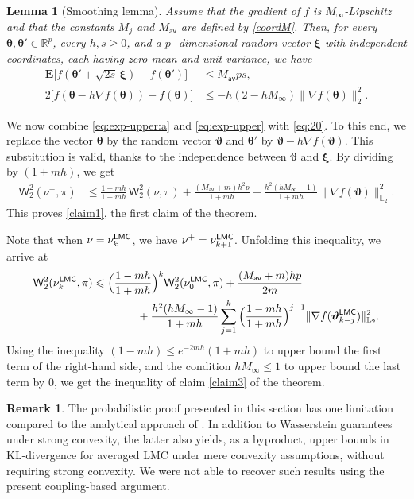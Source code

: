 \documentclass[aos,reqno]{imsart}
\newcommand\bxi{\boldsymbol\xi}
\newcommand\btheta{\boldsymbol\theta}
\newcommand\bvartheta{\boldsymbol\vartheta}
\def\wass{\mathsf{W}}
\def\Mav{M_{\textsf{av}}}
\def\Mmax{M_{\infty}}
\newtheorem{lemma}{Lemma}
\theoremstyle{definition}
\newtheorem{remark}{Remark}
\begin{document}
\begin{lemma}[Smoothing lemma]\label{lem:exp-upper}
    Assume that the gradient of $f$ is 
    $\Mmax$-Lipschitz and that the constants $M_j$
    and\/ $\Mav$ are defined by \eqref{coordM}. Then,
    for every  $\btheta,\btheta'\in\mathbb
    R^p$, every $h,s\geqslant 0$, and a $p$-
    dimensional random vector $\bxi$ with
    independent coordinates, each having zero mean and 
    unit variance, we have
    \begin{align}
        \mathbf E\big[f(\btheta'
        +\sqrt{2s}\, \bxi) - f(\btheta')\big]
        &\leqslant
        \Mav ps,
        \label{eq:exp-upper:a}\\
        2\big[f(\btheta-h\nabla f (\btheta)) - 
        f(\btheta)\big] &\leqslant  - h (2- 
        h{\Mmax}) \|\nabla f(\btheta) \|_2^2.
        \label{eq:exp-upper}
    \end{align}
\end{lemma}
We now combine \eqref{eq:exp-upper:a} and 
\eqref{eq:exp-upper} with \eqref{eq:20}. To this
end, we replace the vector $\btheta$ by the random
vector $\bvartheta$ and $\btheta'$ by $\bvartheta
- h\nabla f(\bvartheta)$. This substitution is
valid, thanks to the independence between $\bvartheta$ 
and $\bxi$. By dividing by $(1+mh)$, we get  
\begin{align}\label{eq:2:9}
    \wass_2^2(\nu^+, \pi) 
    &\leqslant \frac{1-mh}{1+mh}\,\wass_2^2(\nu, \pi) +
    \frac{(\Mav+m)h^2p}{1+mh} + \frac{h^2(h\Mmax -1)}{1+mh}\|\nabla f(\bvartheta)\|_{\mathbb L_2}^2.
\end{align}
This proves \eqref{claim1}, the first claim of the theorem. 

Note that when $\nu = \nu_{k}^{\sf LMC}$,  we have 
$\nu^+ = \nu_{k+1}^{\sf LMC}$. Unfolding this inequality, 
we arrive at
\begin{align}
    \wass_2^2(\nu^{\sf LMC}_{k}, \pi) 
    &\leqslant \Big(\frac{1-mh}{1+mh}\Big)^k
    \wass_2^2(\nu^{\sf LMC}_0, \pi) +
    \frac{(\Mav+m)hp}{2m} \\
    &\qquad\qquad+ \frac{h^2(h\Mmax -1)}{1+mh}\sum_{j=1}^k
    \Big(\frac{1-mh}{1+mh}\Big)^{j-1}\|\nabla 
    f(\bvartheta_{k-j}^{\sf LMC})\|_{\mathbb L_2}^2.
\end{align}
Using the inequality $(1-mh)\leqslant e^{-2mh}(1+mh)$ to
upper bound the first term of the right-hand side, and
the condition $h\Mmax\leqslant 1$ to upper bound the
last term by $0$, we get the inequality of claim 
\eqref{claim3} of the theorem.

\begin{remark}
    The probabilistic proof presented in this section has
    one limitation compared to the analytical approach of
    \cite{durmus2019analysis}. In addition to Wasserstein
    guarantees under strong convexity, the latter also
    yields, as a byproduct, upper bounds in KL-divergence
    for averaged LMC under mere convexity assumptions,
    without requiring strong convexity. We were not able
    to recover such results using the present 
    coupling-based argument.
\end{remark}
\end{document}
